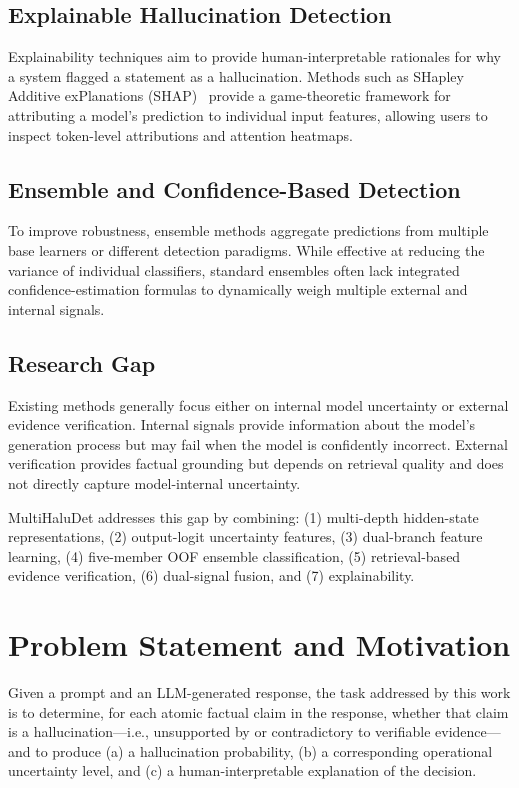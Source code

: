 \documentclass[conference]{IEEEtran}
\begin{document}
\subsection{Explainable Hallucination Detection}
Explainability techniques aim to provide human-interpretable rationales for why a system flagged a statement as a hallucination. Methods such as SHapley Additive exPlanations (SHAP)~\cite{lundberg2017unified} provide a game-theoretic framework for attributing a model’s prediction to individual input features, allowing users to inspect token-level attributions and attention heatmaps.

\subsection{Ensemble and Confidence-Based Detection}
To improve robustness, ensemble methods aggregate predictions from multiple base learners or different detection paradigms. While effective at reducing the variance of individual classifiers, standard ensembles often lack integrated confidence-estimation formulas to dynamically weigh multiple external and internal signals.

\subsection{Research Gap}
Existing methods generally focus either on internal model uncertainty or external evidence verification. Internal signals provide information about the model's generation process but may fail when the model is confidently incorrect. External verification provides factual grounding but depends on retrieval quality and does not directly capture model-internal uncertainty.

MultiHaluDet addresses this gap by combining: (1) multi-depth hidden-state representations, (2) output-logit uncertainty features, (3) dual-branch feature learning, (4) five-member OOF ensemble classification, (5) retrieval-based evidence verification, (6) dual-signal fusion, and (7) explainability.

\section{Problem Statement and Motivation}
Given a prompt and an LLM-generated response, the task addressed by this work is to determine, for each atomic factual claim in the response, whether that claim is a hallucination---i.e., unsupported by or contradictory to verifiable evidence---and to produce (a) a hallucination probability, (b) a corresponding operational uncertainty level, and (c) a human-interpretable explanation of the decision. 
\end{document}
